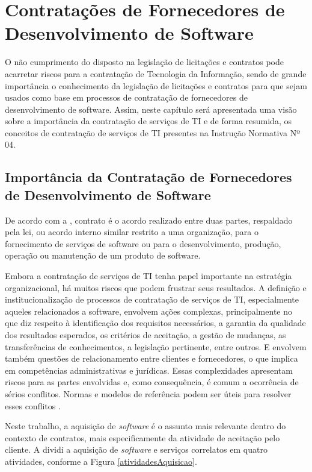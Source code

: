 \chapter{Contratações de Fornecedores de Desenvolvimento de Software}
\label{chap:contratos}

O não cumprimento do disposto na legislação de licitações e contratos pode acarretar riscos para a contratação de Tecnologia da Informação, sendo de grande importância o conhecimento da legislação de licitações e contratos para que sejam usados como base em processos de contratação de fornecedores de desenvolvimento de software.
Assim, neste capítulo será apresentada uma visão sobre a importância da contratação de
serviços de TI e de forma resumida, os conceitos de contratação de serviços de TI presentes na Instrução Normativa Nº 04.

\section{Importância da Contratação de Fornecedores de Desenvolvimento de Software}

De acordo com a , contrato é o acordo realizado entre duas partes, respaldado pela lei, ou acordo interno similar restrito a uma organização, para o fornecimento de serviços de software ou para o desenvolvimento, produção, operação ou manutenção de um produto de software.

Embora a contratação de serviços de TI tenha papel importante na estratégia organizacional, há muitos riscos que podem frustrar seus resultados. A definição e institucionalização de processos de contratação de serviços de TI, especialmente aqueles relacionados a software, envolvem ações complexas, principalmente no que diz respeito à identificação dos requisitos necessários, a garantia da qualidade dos resultados esperados, os critérios de aceitação, a gestão de mudanças, as transferências de conhecimentos, a legislação pertinente, entre outros. E envolvem também questões de relacionamento entre clientes e fornecedores, o que implica em competências administrativas e jurídicas. Essas complexidades apresentam riscos para as partes envolvidas e, como consequência, é comum a ocorrência de sérios conflitos. Normas e modelos de referência podem ser úteis para resolver esses conflitos \cite{processoContratacao}.

Neste trabalho, a aquisição de \textit{software} é o assunto mais relevante dentro do contexto de contratos,  mais especificamente da atividade de aceitação pelo cliente. A \cite{ISO:12207} dividi a aquisição de \textit{software} e serviços correlatos em quatro atividades, conforme a Figura \ref{atividadesAquisicao}.


